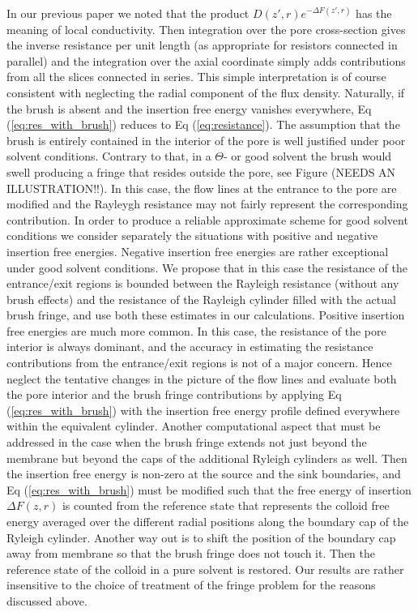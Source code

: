 \documentclass[12pt, a4paper]{article}
\begin{document}
In our previous paper we noted that the product $D(z',r)e^{-\Delta F(z',r)}$ has the meaning of local conductivity. Then integration over the pore cross-section gives the inverse resistance per unit length (as appropriate for resistors connected in parallel) and the integration over the axial coordinate simply adds contributions from all the slices connected in series. This simple interpretation is of course consistent with neglecting the radial component of the flux density. Naturally, if the brush is absent and the insertion free energy vanishes everywhere, Eq  (\ref{eq:res_with_brush}) reduces to Eq (\ref{eq:resistance}). 
The assumption that the brush is entirely contained in the interior of the pore is well justified under poor solvent conditions. Contrary to that, in a $\Theta$- or good solvent the brush would swell producing a fringe that resides outside the pore, see Figure (NEEDS AN ILLUSTRATION!!). In this case, the flow lines at the entrance to the pore are modified and the Rayleygh resistance may not fairly represent the corresponding contribution. 
In order to produce a reliable approximate scheme for good solvent conditions we consider separately the situations with positive and negative insertion free energies. Negative insertion free energies are rather exceptional under good solvent conditions. We propose that in this case  the resistance of the entrance/exit regions is bounded between the Rayleigh resistance (without any brush effects) and the resistance of the Rayleigh cylinder filled with the actual brush fringe, and use both these estimates in our calculations.
Positive insertion free energies are much more common. In this case, the resistance of the pore interior is always dominant, and the accuracy in estimating the resistance contributions from the entrance/exit regions is not of a major concern. Hence neglect the tentative changes in the picture of the flow lines and evaluate both the pore interior and the brush fringe contributions by applying  Eq (\ref{eq:res_with_brush}) with the insertion free energy profile defined everywhere within the equivalent cylinder.
Another computational aspect that must be addressed in the case when the brush fringe extends not just beyond the membrane but beyond the caps of the additional Ryleigh cylinders as well. Then the insertion free energy is non-zero at the source and the sink boundaries, and Eq (\ref{eq:res_with_brush}) must be modified such that the free energy of insertion $\Delta F(z,r)$ is counted from the reference state that represents the colloid free energy averaged over the different radial positions along the boundary cap of the Ryleigh cylinder. Another way out is to shift the position of the boundary cap away from membrane so that the brush fringe does not touch it. Then the reference state of the colloid in a pure solvent is restored. Our results are rather insensitive to the choice of treatment of the fringe problem for the reasons discussed above.
\end{document}
